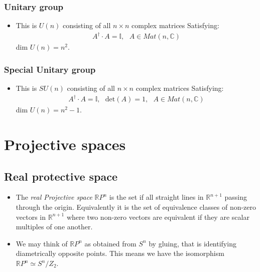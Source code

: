 \documentclass[11pt]{article}
\numberwithin{equation}{section}
\DeclareRobustCommand{\RR}{\mathbb{R}}
\begin{document}
\subsubsection{Unitary group}
    \begin{itemize}
      \item This is $U(n)$ consisting of all $n \times n$ complex matrices Satisfying:  
      \begin{align*}
A^{\dagger} \cdot A = \mathbb{I},~~~A \in Mat(n,\mathbb{C})
\end{align*}
dim $U(n) =n^2$.
\end{itemize}

\subsubsection{Special Unitary group}
    \begin{itemize}
      \item This is $SU(n)$ consisting of all $n \times n$ complex matrices Satisfying:  
      \begin{align*}
A^{\dagger} \cdot A = \mathbb{I},~~~\text{det}(A)=1,~~~A \in Mat(n,\mathbb{C})
\end{align*}
dim $U(n) =n^2-1$.
\end{itemize}

\newpage
\section{Projective spaces}
\subsection{Real protective space}
\begin{itemize}
  \item The \emph{real Projective space} $\RR P^{n}$ is the set if all straight lines in $\RR^{n+1}$ passing through the origin. Equivalently it is the set of equivalence classes of non-zero vectors in $\RR^{n+1}$ where two non-zero vectors are equivalent if they are scalar multiples of one another. 

   \item We may think of $\RR P^n$ as obtained from $S^{n}$ by gluing, that is identifying diametrically opposite points. This means we have the isomorphism $\RR P^n \simeq S^{n}/Z_2$.   
\end{itemize}
\end{document}
